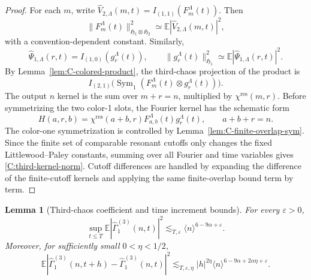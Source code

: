 \documentclass[10pt]{amsart}
\numberwithin{equation}{section}
\theoremstyle{plain}
\newtheorem{lemma}[theorem]{Lemma}
\theoremstyle{definition}
\theoremstyle{remark}
\newcommand{\E}{\mathbb{E}}
\newcommand{\eps}{\varepsilon}
\newcommand{\la}{\langle}
\newcommand{\ra}{\rangle}
\newcommand{\wh}{\widehat}
\newcommand{\HH}{\mathfrak{H}}
\providecommand{\Sym}{\operatorname{Sym}}
\begin{document}
\begin{proof}
For each \(m\), write \(\wh V_{2,\Lambda}(m,t)=I_{(1,1)}(F_m^\Lambda(t))\).  Then
\[
        \|F_m^\Lambda(t)\|_{\HH_1\otimes\HH_2}^2
        \simeq \E|\wh V_{2,\Lambda}(m,t)|^2,
\]
with a convention-dependent constant.  Similarly,
\[
        \wh\Psi_{1,\Lambda}(r,t)=I_{(1,0)}(g_r^\Lambda(t)),
        \qquad
        \|g_r^\Lambda(t)\|_{\HH_1}^2
        \simeq \E|\wh\Psi_{1,\Lambda}(r,t)|^2.
\]
By Lemma~\ref{lem:C-colored-product}, the third-chaos projection of the product is
\[
        I_{(2,1)}\bigl(\Sym_1(F_m^\Lambda(t)\otimes g_r^\Lambda(t))\bigr).
\]
The output \(n\) kernel is the sum over \(m+r=n\), multiplied by \(\chi^{\mathrm{res}}(m,r)\).  Before symmetrizing the two color-1 slots, the Fourier kernel has the schematic form
\[
        H(a,r,b)=\chi^{\mathrm{res}}(a+b,r)F_{a,b}^\Lambda(t)g_r^\Lambda(t),
        \qquad a+b+r=n.
\]
The color-one symmetrization is controlled by Lemma~\ref{lem:C-finite-overlap-sym}.  Since the finite set of comparable resonant cutoffs only changes the fixed Littlewood--Paley constants, summing over all Fourier and time variables gives \eqref{C:third-kernel-norm}.  Cutoff differences are handled by expanding the difference of the finite-cutoff kernels and applying the same finite-overlap bound term by term.
\end{proof}

\begin{lemma}[Third-chaos coefficient and time increment bounds]\label{lem:C-third-coeff}
For every \(\eps>0\),
\begin{equation}\label{C:third-fixed-bound}
        \sup_{t\le T}\E|\wh\Gamma_1^{(3)}(n,t)|^2
        \lesssim_{T,\eps}\la n\ra^{6-9\alpha+\eps}.
\end{equation}
Moreover, for sufficiently small \(0<\eta<1/2\),
\begin{equation}\label{C:third-increment-bound}
        \E|\wh\Gamma_1^{(3)}(n,t+h)-\wh\Gamma_1^{(3)}(n,t)|^2
        \lesssim_{T,\eps,\eta}
        |h|^{2\eta}\la n\ra^{6-9\alpha+2\alpha\eta+\eps}.
\end{equation}
\end{lemma}
\end{document}
